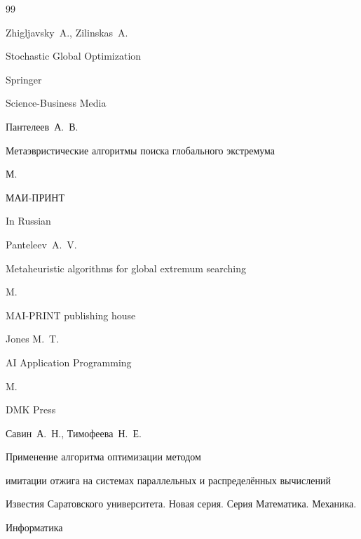 \begin{thebibliography}{99}




\by Zhigljavsky~A., Zilinskas~A.

\book Stochastic Global Optimization

\publ Springer

Science-Business Media






\by Пантелеев~А.~В.

\book Метаэвристические алгоритмы поиска глобального экстремума

\publaddr  М.

\publ МАИ-ПРИНТ



\misctransl

\lang In Russian

\by Panteleev~A.~V.

\book Metaheuristic algorithms for global extremum searching

\publaddr M.

\publ MAI-PRINT publishing house








\by Jones M.~T.

\book AI Application Programming

\publaddr M.

\publ DMK Press






\by Савин~А.~Н., Тимофеева~Н.~Е.

\paper Применение алгоритма оптимизации методом

имитации отжига на системах параллельных и распределённых вычислений

\jour Известия Саратовского университета. Новая серия. Серия Математика. Механика.

Информатика


\end{thebibliography}
